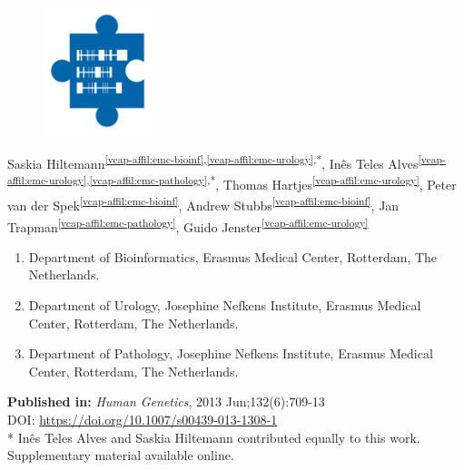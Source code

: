 \cleartorightpage
\setcounter{NAT@ctr}{-1}
\chapter*{}\label{chapter:vcap}

\begin{figure}[t!]
\centering
\includegraphics[height=10em]{frontmatter/images/chapter-header-fusion.png}
\end{figure}
\vspace{-4cm}

\label{chapter:vcap-paper}

Saskia Hiltemann\textsuperscript{\ref{vcap-affil:emc-bioinf},\ref{vcap-affil:emc-urology},*},
Inês Teles Alves\textsuperscript{\ref{vcap-affil:emc-urology},\ref{vcap-affil:emc-pathology},*},
Thomas Hartjes\textsuperscript{\ref{vcap-affil:emc-urology}},
Peter van der Spek\textsuperscript{\ref{vcap-affil:emc-bioinf}},
Andrew Stubbs\textsuperscript{\ref{vcap-affil:emc-bioinf}},
Jan Trapman\textsuperscript{\ref{vcap-affil:emc-pathology}},
Guido Jenster\textsuperscript{\ref{vcap-affil:emc-urology}}

\small
\begin{enumerate}
\itemsep-0.5em
\item Department of Bioinformatics, Erasmus Medical Center, Rotterdam, The Netherlands.\label{vcap-affil:emc-bioinf}
\item Department of Urology, Josephine Nefkens Institute, Erasmus Medical Center, Rotterdam, The Netherlands.\label{vcap-affil:emc-urology}
\item Department of Pathology, Josephine Nefkens Institute, Erasmus Medical Center, Rotterdam, The Netherlands.\label{vcap-affil:emc-pathology}
\end{enumerate}


\textbf{Published in:} \emph{Human Genetics}, 2013 Jun;132(6):709-13 \\
DOI: \url{https://doi.org/10.1007/s00439-013-1308-1} \\
* Inês Teles Alves and Saskia Hiltemann contributed equally to this work.\\
Supplementary material available online. \\

